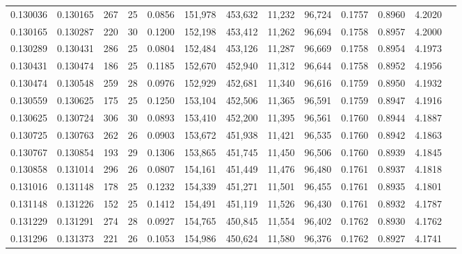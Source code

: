 \begin{tabular}{rrrrrrrrrrrrr}
0.130036 & 0.130165 &   267 &  25 &                                     0.0856 & 151,978 & 453,632 &  11,232 &  96,724 & 0.1757 & 0.8960 & 4.2020 \\
0.130165 & 0.130287 &   220 &  30 &                                     0.1200 & 152,198 & 453,412 &  11,262 &  96,694 & 0.1758 & 0.8957 & 4.2000 \\
0.130289 & 0.130431 &   286 &  25 &                                     0.0804 & 152,484 & 453,126 &  11,287 &  96,669 & 0.1758 & 0.8954 & 4.1973 \\
0.130431 & 0.130474 &   186 &  25 &                                     0.1185 & 152,670 & 452,940 &  11,312 &  96,644 & 0.1758 & 0.8952 & 4.1956 \\
0.130474 & 0.130548 &   259 &  28 &                                     0.0976 & 152,929 & 452,681 &  11,340 &  96,616 & 0.1759 & 0.8950 & 4.1932 \\
0.130559 & 0.130625 &   175 &  25 &                                     0.1250 & 153,104 & 452,506 &  11,365 &  96,591 & 0.1759 & 0.8947 & 4.1916 \\
0.130625 & 0.130724 &   306 &  30 &                                     0.0893 & 153,410 & 452,200 &  11,395 &  96,561 & 0.1760 & 0.8944 & 4.1887 \\
0.130725 & 0.130763 &   262 &  26 &                                     0.0903 & 153,672 & 451,938 &  11,421 &  96,535 & 0.1760 & 0.8942 & 4.1863 \\
0.130767 & 0.130854 &   193 &  29 &                                     0.1306 & 153,865 & 451,745 &  11,450 &  96,506 & 0.1760 & 0.8939 & 4.1845 \\
0.130858 & 0.131014 &   296 &  26 &                                     0.0807 & 154,161 & 451,449 &  11,476 &  96,480 & 0.1761 & 0.8937 & 4.1818 \\
0.131016 & 0.131148 &   178 &  25 &                                     0.1232 & 154,339 & 451,271 &  11,501 &  96,455 & 0.1761 & 0.8935 & 4.1801 \\
0.131148 & 0.131226 &   152 &  25 &                                     0.1412 & 154,491 & 451,119 &  11,526 &  96,430 & 0.1761 & 0.8932 & 4.1787 \\
0.131229 & 0.131291 &   274 &  28 &                                     0.0927 & 154,765 & 450,845 &  11,554 &  96,402 & 0.1762 & 0.8930 & 4.1762 \\
0.131296 & 0.131373 &   221 &  26 &                                     0.1053 & 154,986 & 450,624 &  11,580 &  96,376 & 0.1762 & 0.8927 & 4.1741 \\

\end{tabular}
